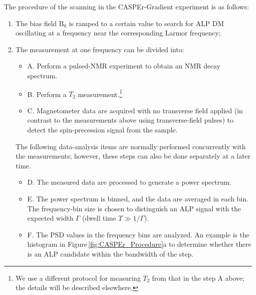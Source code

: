 \documentclass{WileyMSP-template}
\newcommand{\YZ}[1]{\textcolor{purple}{Yuzhe: #1}}
\newcommand{\DK}[1]{\textcolor{brown}{Derek: #1}}
\newcommand{\AW}[1]{\textcolor{cyan}{Arne: #1}}
\begin{document}
	The procedure of the scanning in the CASPEr-Gradient experiment is as follows:
	\begin{enumerate}[label = (\arabic*)]
		\item The bias field $\mathrm{B}_0$ is ramped to a certain value to search for ALP DM oscillating at a frequency near the corresponding Larmor frequency; 
		\item The measurement at one frequency can be divided into:
		\begin{itemize}[label={}] %
			\item A. Perform a pulsed-NMR experiment to obtain an NMR decay spectrum.
			\item B. Perform a $T_2$ measurement.\footnote{We use a different protocol for measuring $T_2$ from that in the step A above; the details will be described elsewhere.}
			\item C. Magnetometer data are acquired with no transverse field applied (in contrast to the measurements above using transverse-field pulses) to detect the spin-precession signal from the sample. 
		\end{itemize}
		The following data-analysis items are normally performed concurrently with the measurements; however, these steps can also be done separately at a later time.
		\begin{itemize}[label={}]
			\item D. The measured data are processed to generate a power spectrum. 
			\item E. The power spectrum is binned, and the data are averaged in each bin. %
			The frequency-bin size is chosen to distinguish an ALP signal with the expected width $\Gamma$ (dwell time $T \gg 1/\Gamma$). 
			\item F. The PSD values in the frequency bins are analyzed. An example is the histogram in Figure\,\ref{fig:CASPEr_Procedure}a to determine whether there is an ALP candidate within the bandwidth of the step. 

\end{itemize}
\end{enumerate}
\end{document}
